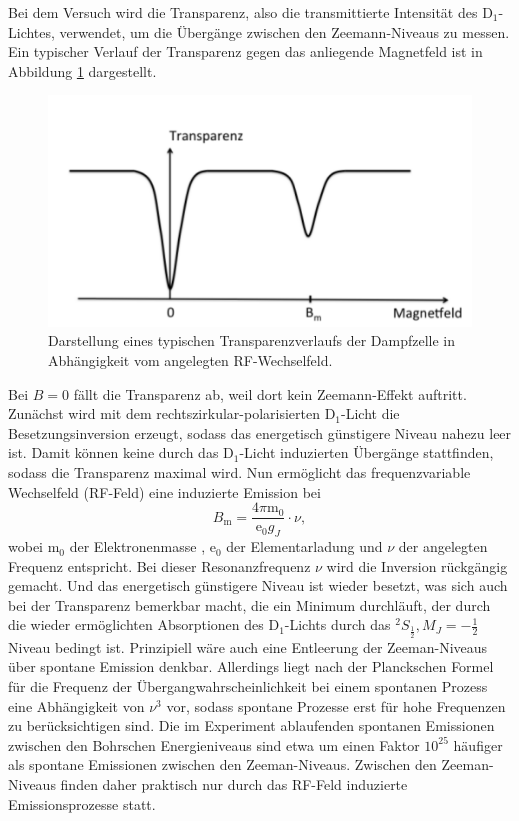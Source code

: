 Bei dem Versuch wird die Transparenz, also die transmittierte Intensität
des D$_1$-Lichtes, verwendet, um die Übergänge zwischen den Zeemann-Niveaus
zu messen.
Ein typischer Verlauf der Transparenz gegen das anliegende Magnetfeld
ist in Abbildung \ref{fig:transparenz} dargestellt.
\begin{figure}
  \centering
  \includegraphics[width=0.9\columnwidth]{pictures/transparenz.png}
  \caption{Darstellung eines typischen Transparenzverlaufs der Dampfzelle in Abhängigkeit vom angelegten RF-Wechselfeld. \cite{Anleitung}}
  \label{fig:transparenz}
\end{figure}
Bei $B=0$ fällt die Transparenz ab, weil dort
kein Zeemann-Effekt auftritt.
Zunächst wird mit dem rechtszirkular-polarisierten D$_1$-Licht die Besetzungsinversion erzeugt, sodass
das energetisch günstigere Niveau nahezu leer ist. Damit können keine
durch das D$_1$-Licht induzierten Übergänge stattfinden, sodass die
Transparenz maximal wird. Nun ermöglicht das frequenzvariable
Wechselfeld (RF-Feld) eine induzierte Emission bei
\begin{equation}
	\label{eqn:g_f}
	B_{\mathrm{m}} = \frac{4\pi \mathrm{m}_0}{\mathrm{e}_0 g_J}\cdot \nu \mathrm{,}
\end{equation}
wobei $\mathrm{m}_0$ der Elektronenmasse \cite{m_0}, $\mathrm{e}_0$ der
Elementarladung \cite{e} und $\nu$ der angelegten Frequenz entspricht.
Bei dieser Resonanzfrequenz $\nu$ wird die Inversion rückgängig gemacht.
Und das energetisch günstigere Niveau ist wieder besetzt, was sich auch
bei der Transparenz bemerkbar macht, die ein Minimum durchläuft, der durch die wieder
ermöglichten Absorptionen des D$_1$-Lichts durch das
$^2S_{\frac{1}{2}}, M_J = -\frac{1}{2}$ Niveau bedingt ist.
Prinzipiell wäre auch eine Entleerung der Zeeman-Niveaus über spontane Emission denkbar. Allerdings liegt nach der Planckschen Formel für die Frequenz der Übergangwahrscheinlichkeit bei einem spontanen Prozess eine Abhängigkeit von $\nu^3$ vor, sodass spontane Prozesse erst für hohe Frequenzen zu berücksichtigen sind.
Die im Experiment ablaufenden spontanen Emissionen zwischen den Bohrschen Energieniveaus sind etwa um einen Faktor $10^{25}$ häufiger als spontane Emissionen zwischen den Zeeman-Niveaus. Zwischen den Zeeman-Niveaus finden daher praktisch nur durch das RF-Feld induzierte Emissionsprozesse statt.
